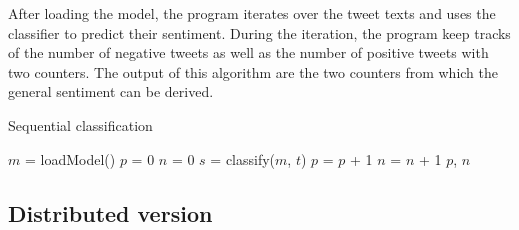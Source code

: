 \documentclass[10pt,twocolumn,letterpaper]{article}
\begin{document}
After loading the model, the program iterates over the tweet texts and uses the classifier to predict their sentiment. During the iteration, the program keep tracks of the number of negative tweets as well as the number of positive tweets with two counters. The output of this algorithm are the two counters from which the general sentiment can be derived.

\begin{algorithm}[H]
\label{SequentialClassification}
\caption{Sequential classification}
\begin{algorithmic}

    \State $m$ = loadModel()
    \State $p$ = 0
    \State $n$ = 0
        \State $s$ = classify($m$, $t$)
            \State $p$ = $p$ + 1
        \Else
            \State $n$ = $n$ + 1
        \EndIf
    \EndFor
    \State \Return $p$, $n$

\end{algorithmic}
\end{algorithm}

\subsection{Distributed version}
\end{document}
